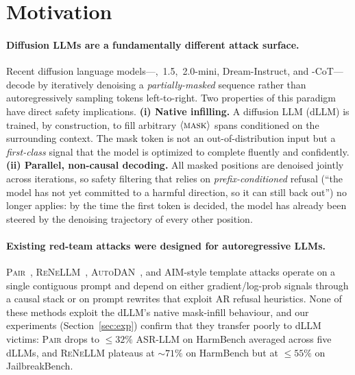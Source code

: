 
\section{Motivation}
\label{sec:motivation}

\paragraph{Diffusion LLMs are a fundamentally different attack surface.}
Recent diffusion language models---\llada, \llada\,1.5, \llada\,2.0-mini,
Dream-Instruct, and \mmada-CoT---decode by iteratively denoising a
\emph{partially-masked} sequence rather than autoregressively sampling tokens
left-to-right. Two properties of this paradigm have direct safety implications.
\textbf{(i) Native infilling.} A diffusion LLM (dLLM) is trained, by
construction, to fill arbitrary $\langle\textsc{mask}\rangle$ spans conditioned on
the surrounding context. The mask token is not an out-of-distribution input but
a \emph{first-class} signal that the model is optimized to complete fluently
and confidently. \textbf{(ii) Parallel, non-causal decoding.} All masked
positions are denoised jointly across iterations, so safety filtering that
relies on \emph{prefix-conditioned} refusal (``the model has not yet committed
to a harmful direction, so it can still back out'') no longer applies: by the
time the first token is decided, the model has already been steered by the
denoising trajectory of every other position.

\paragraph{Existing red-team attacks were designed for autoregressive LLMs.}
\textsc{Pair}~\citep{chao2024pair}, \textsc{ReNeLLM}~\citep{ding2024renellm},
\textsc{AutoDAN}~\citep{liu2024autodan}, and \textsc{AIM}-style template
attacks operate on a single contiguous prompt and depend on either
gradient/log-prob signals through a causal stack or on prompt rewrites that
exploit AR refusal heuristics. None of these methods exploit the dLLM's native
mask-infill behaviour, and our experiments (Section~\ref{sec:exp}) confirm that
they transfer poorly to dLLM victims: \textsc{Pair} drops to $\le 32\%$ ASR-LLM
on HarmBench averaged across five dLLMs, and \textsc{ReNeLLM} plateaus at
$\sim 71\%$ on HarmBench but at $\le 55\%$ on JailbreakBench.

